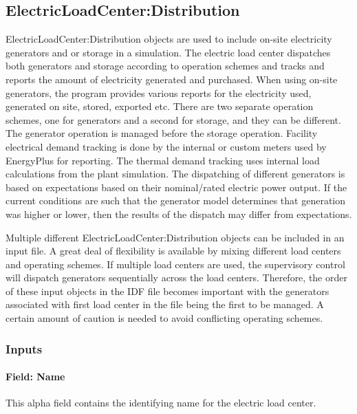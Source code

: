 \subsection{ElectricLoadCenter:Distribution}\label{electricloadcenterdistribution}

ElectricLoadCenter:Distribution objects are used to include on-site electricity generators and or storage in a simulation. The electric load center dispatches both generators and storage according to operation schemes and tracks and reports the amount of electricity generated and purchased. When using on-site generators, the program provides various reports for the electricity used, generated on site, stored, exported etc. There are two separate operation schemes, one for generators and a second for storage, and they can be different. The generator operation is managed before the storage operation. Facility electrical demand tracking is done by the internal or custom meters used by EnergyPlus for reporting. The thermal demand tracking uses internal load calculations from the plant simulation. The dispatching of different generators is based on expectations based on their nominal/rated electric power output. If the current conditions are such that the generator model determines that generation was higher or lower, then the results of the dispatch may differ from expectations.

Multiple different ElectricLoadCenter:Distribution objects can be included in an input file. A great deal of flexibility is available by mixing different load centers and operating schemes. If multiple load centers are used, the supervisory control will dispatch generators sequentially across the load centers. Therefore, the order of these input objects in the IDF file becomes important with the generators associated with first load center in the file being the first to be managed. A certain amount of caution is needed to avoid conflicting operating schemes.

\subsubsection{Inputs}\label{inputs-1-012}

\paragraph{Field: Name}\label{field-name-013}

This alpha field contains the identifying name for the electric load center.

